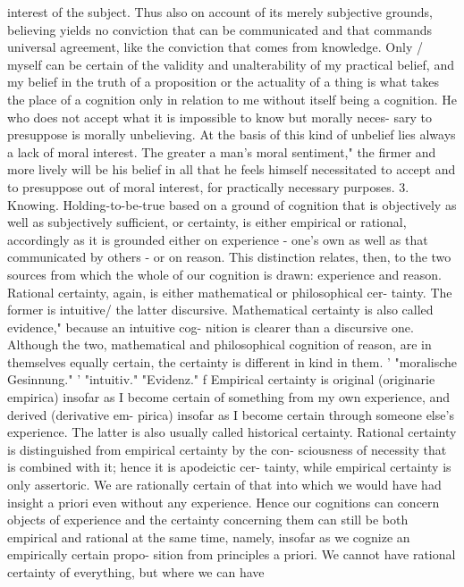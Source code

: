interest of the subject.
Thus also on account of its merely subjective grounds, believing yields
no conviction that can be communicated and that commands universal
agreement, like the conviction that comes from knowledge. Only / myself
can be certain of the validity and unalterability of my practical belief, and
my belief in the truth of a proposition or the actuality of a thing is what
takes the place of a cognition only in relation to me without itself being a
cognition.
He who does not accept what it is impossible to know but morally neces-
sary to presuppose is morally unbelieving. At the basis of this kind of
unbelief lies always a lack of moral interest. The greater a man's moral
sentiment," the firmer and more lively will be his belief in all that he feels
himself necessitated to accept and to presuppose out of moral interest, for
practically necessary purposes.
3. Knowing. Holding-to-be-true based on a ground of cognition that is
objectively as well as subjectively sufficient, or certainty, is either empirical
or rational, accordingly as it is grounded either on experience - one's own
as well as that communicated by others - or on reason. This distinction
relates, then, to the two sources from which the whole of our cognition is
drawn: experience and reason.
Rational certainty, again, is either mathematical or philosophical cer-
tainty. The former is intuitive/ the latter discursive.
Mathematical certainty is also called evidence," because an intuitive cog-
nition is clearer than a discursive one. Although the two, mathematical
and philosophical cognition of reason, are in themselves equally certain,
the certainty is different in kind in them.
' "moralische Gesinnung."
' "intuitiv."
"Evidenz."
f
Empirical certainty is original (originarie empirica) insofar as I become
certain of something from my own experience, and derived (derivative em-
pirica) insofar as I become certain through someone else's experience. The
latter is also usually called historical certainty.
Rational certainty is distinguished from empirical certainty by the con-
sciousness of necessity that is combined with it; hence it is apodeictic cer-
tainty, while empirical certainty is only assertoric. We are rationally certain
of that into which we would have had insight a priori even without any
experience. Hence our cognitions can concern objects of experience and
the certainty concerning them can still be both empirical and rational at
the same time, namely, insofar as we cognize an empirically certain propo-
sition from principles a priori.
We cannot have rational certainty of everything, but where we can have
